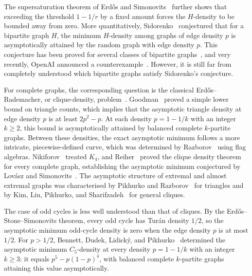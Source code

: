 \documentclass[11pt]{article}
\theoremstyle{remark}
\numberwithin{equation}{section}
\begin{document}
The supersaturation theorem of Erd\H os and Simonovits~\cite{erdos1983supersaturated} further shows that exceeding the threshold $1-1/r$ by a fixed amount forces the $H$-density to be bounded away from zero.
More quantitatively, Sidorenko~\cite{sidorenko1991inequalities} conjectured that for a bipartite graph $H$, the minimum $H$-density among graphs of edge density $p$ is asymptotically attained by the random graph with edge density $p$. 
This conjecture has been proved for several classes of bipartite graphs~\cite{conlon2010approximate,conlon2018some,conlon2017finite,conlon2021sidorenko,hatami2010graph,im2026sidorenko,kim2016two,li2025logarithmic,sidorenko1993correlation,szegedy2014information}, and very recently, OpenAI announced a counterexample~\cite{openai2026counterexample}. However, it is still far from completely understood which bipartite graphs satisfy Sidorenko's conjecture.

For complete graphs, the corresponding question is the classical Erd\H os--Rademacher, or clique-density, problem~\cite{erdos1962number}.
Goodman~\cite{goodman1959sets} proved a simple lower bound on triangle counts, which implies that the asymptotic triangle density at edge density $p$ is at least $2p^2-p$.
At each density $p=1-1/k$ with an integer $k\ge2$, this bound is asymptotically attained by balanced complete $k$-partite graphs.
Between these densities, the exact asymptotic minimum follows a more intricate, piecewise-defined curve, which was determined by Razborov~\cite{razborov2008minimal} using flag algebras.
Nikiforov~\cite{nikiforov2010number} treated $K_4$, and Reiher~\cite{reiher2016clique} proved the clique density theorem for every complete graph, establishing the asymptotic minimum conjectured by Lov\'asz and Simonovits~\cite{lovasz1983number}.
The asymptotic structure of extremal and almost extremal graphs was characterised by Pikhurko and Razborov~\cite{pikhurko2017asymptotic} for triangles and by Kim, Liu, Pikhurko, and Sharifzadeh~\cite{kim2020asymptotic} for general cliques.

The case of odd cycles is less well understood than that of cliques.
By the Erd\H os--Stone--Simonovits theorem, every odd cycle has Tur\'an density $1/2$, so the asymptotic minimum odd-cycle density is zero when the edge density $p$ is at most $1/2$.
For $p>1/2$, Bennett, Dudek, Lidick\'{y}, and Pikhurko~\cite{bennett2020minimizing} determined the asymptotic minimum $C_5$-density at every density $p=1-1/k$ with an integer $k\ge3$: it equals $p^5-p(1-p)^4$, with balanced complete $k$-partite graphs attaining this value asymptotically.
\end{document}
